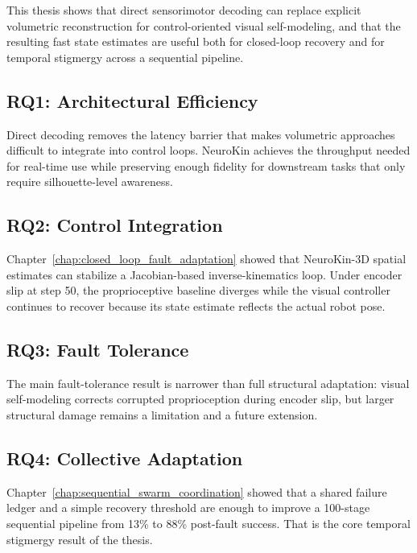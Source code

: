 \documentclass[12pt,a4paper,oneside]{report}
\begin{document}
This thesis shows that direct sensorimotor decoding can replace explicit volumetric reconstruction for control-oriented visual self-modeling, and that the resulting fast state estimates are useful both for closed-loop recovery and for temporal stigmergy across a sequential pipeline.

\subsection{RQ1: Architectural Efficiency}
\label{subsec:rq1_architectural_efficiency_1}

Direct decoding removes the latency barrier that makes volumetric approaches difficult to integrate into control loops. NeuroKin achieves the throughput needed for real-time use while preserving enough fidelity for downstream tasks that only require silhouette-level awareness.

\subsection{RQ2: Control Integration}
\label{subsec:rq2_control_integration_1}

Chapter~\ref{chap:closed_loop_fault_adaptation} showed that NeuroKin-3D spatial estimates can stabilize a Jacobian-based inverse-kinematics loop. Under encoder slip at step 50, the proprioceptive baseline diverges while the visual controller continues to recover because its state estimate reflects the actual robot pose.

\subsection{RQ3: Fault Tolerance}
\label{subsec:rq3_fault_tolerance_1}

The main fault-tolerance result is narrower than full structural adaptation: visual self-modeling corrects corrupted proprioception during encoder slip, but larger structural damage remains a limitation and a future extension.

\subsection{RQ4: Collective Adaptation}
\label{subsec:rq4_collective_adaptation_1}

Chapter~\ref{chap:sequential_swarm_coordination} showed that a shared failure ledger and a simple recovery threshold are enough to improve a 100-stage sequential pipeline from 13\% to 88\% post-fault success. That is the core temporal stigmergy result of the thesis.
\end{document}
